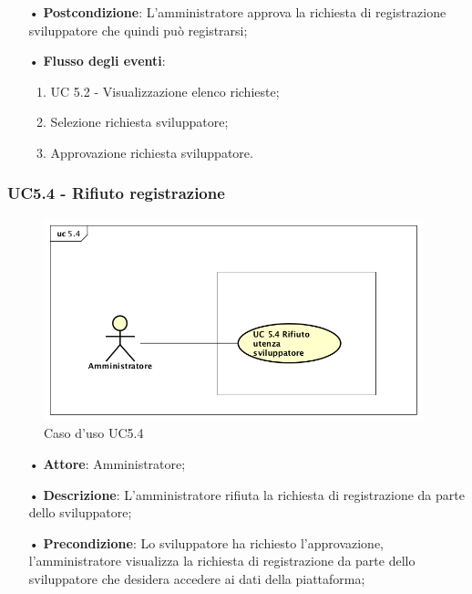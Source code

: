 \begin{itemize}
\begin{itemize}
\begin{itemize}
\item[•] \textbf{Postcondizione}: L'amministratore approva la richiesta di registrazione sviluppatore che quindi può registrarsi;

\item[•] \textbf{Flusso degli eventi}:

\begin{enumerate}

\item UC 5.2 - Visualizzazione elenco richieste;

\item Selezione richiesta sviluppatore;

\item Approvazione richiesta sviluppatore.

\end{enumerate}

\end{itemize}


\subsubsection{UC5.4 - Rifiuto registrazione}

\begin{figure}[H]
\centering
\includegraphics[width=11cm]{img/UC54.png} 
\caption{Caso d'uso UC5.4}
\end{figure}


\begin{itemize}
\item[•] \textbf{Attore}: Amministratore;

\item[•] \textbf{Descrizione}: L’amministratore rifiuta la richiesta di registrazione da parte dello sviluppatore;

\item[•] \textbf{Precondizione}: Lo sviluppatore ha richiesto l'approvazione, l'amministratore visualizza la richiesta di registrazione da parte dello sviluppatore che desidera accedere ai dati della piattaforma;


\end{itemize}
\end{itemize}
\end{itemize}
